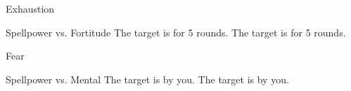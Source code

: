\begin{spellsection}{Exhaustion}
    \begin{spellheader}
    \end{spellheader}
    \begin{spellcontent}
        \begin{spelltargetinginfo}
        \end{spelltargetinginfo}
        \begin{spelleffects}
            \begin{spellattack}{Spellpower vs. Fortitude}
                \spellsuccess The target is \fatigued for 5 rounds.
                \spellcritical The target is \exhausted for 5 rounds.
            \end{spellattack}
        \end{spelleffects}
    \end{spellcontent}
    \begin{spellfooter}
    \end{spellfooter}
\end{spellsection}

\begin{spellsection}[Lesser]{Fear}
    \begin{spellheader}
    \end{spellheader}
    \begin{spellcontent}
        \begin{spelltargetinginfo}
        \end{spelltargetinginfo}
        \begin{spelleffects}
            \begin{spellattack}{Spellpower vs. Mental}
                \spellcritical The target is \frightened by you.
                \spellsuccess The target is \shaken by you.
            \end{spellattack}
            \spelldur \durshort \dismissable
        \end{spelleffects}
    \end{spellcontent}
    \begin{spellfooter}
    \end{spellfooter}
\end{spellsection}


